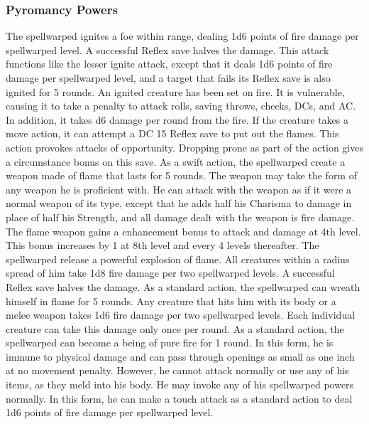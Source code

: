 \subsubsection{Pyromancy Powers}
 The spellwarped ignites a foe within \rngclose range, dealing 1d6 points of fire damage  per spellwarped level. A successful Reflex save halves the damage.
 This attack functions like the lesser ignite attack, except that it deals 1d6 points of fire damage per spellwarped level, and a target that fails its Reflex save is also ignited for 5 rounds. An ignited creature has been set on fire. It is vulnerable, causing it to take a  penalty to attack rolls, saving throws, checks, DCs, and AC. In addition, it takes d6 damage per round from the fire. If the creature takes a move action, it can attempt a DC 15 Reflex save to put out the flames. This action provokes attacks of opportunity. Dropping prone as part of the action gives a  circumstance bonus on this save.
 As a swift action, the spellwarped create a weapon made of flame that lasts for 5 rounds. The weapon may take the form of any weapon he is proficient with. He can attack with the weapon as if it were a normal weapon of its type, except that he adds half his Charisma to damage in place of half his Strength, and all damage dealt with the weapon is fire damage. The flame weapon gains a  enhancement bonus to attack and damage at 4th level. This bonus increases by 1 at 8th level and every 4 levels thereafter.
 The spellwarped release a powerful explosion of flame. All creatures within a \areamed radius spread of him take 1d8 fire damage per two spellwarped levels. A successful Reflex save halves the damage.
 As a standard action, the spellwarped can wreath himself in flame for 5 rounds. Any creature that hits him with its body or a melee weapon takes 1d6 fire damage per two spellwarped levels. Each individual creature can take this damage only once per round.
 As a standard action, the spellwarped can become a being of pure fire for 1 round. In this form, he is immune to physical damage and can pass through openings as small as one inch at no movement penalty. However, he cannot attack normally or use any of his items, as they meld into his body. He may invoke any of his spellwarped powers normally. In this form, he can make a touch attack as a standard action to deal 1d6 points of fire damage per spellwarped level.
